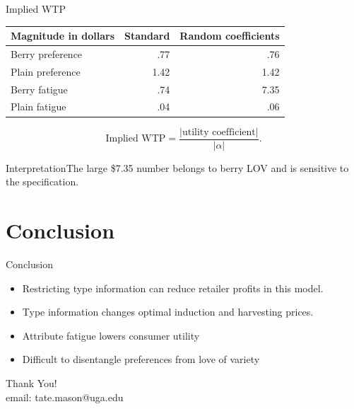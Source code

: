 \documentclass[aspectratio=169,11pt]{beamer}
\begin{document}
\begin{frame}{Implied WTP}
\centering\begin{tabular}{lrr}\toprule
Magnitude in dollars & Standard & Random coefficients\\\midrule
Berry preference & .77 & .76\\
Plain preference & 1.42 & 1.42\\
Berry fatigue & .74 & 7.35\\
Plain fatigue & .04 & .06\\\bottomrule\end{tabular}
\[
\text{Implied WTP}=\frac{|\text{utility coefficient}|}{|\alpha|}.
\]
\begin{block}{Interpretation}The large \$7.35 number belongs to berry LOV and is sensitive to the specification.\end{block}
\end{frame}

\section{Conclusion}
\begin{frame}{Conclusion}
\begin{itemize}
\item Restricting type information can reduce retailer profits in this model.
\item Type information changes optimal induction and harvesting prices.
\item Attribute fatigue lowers consumer utility
\item Difficult to disentangle preferences from love of variety
\end{itemize}
\end{frame}

\begin{frame}
  \centering
  \huge Thank You!\\
\vspace{0.5cm}
  \large email: tate.mason@uga.edu
\end{frame}
\end{document}
